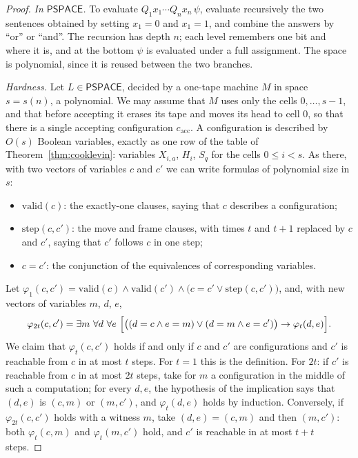 \begin{proof}
\emph{In $\mathsf{PSPACE}$.} To evaluate $Q_1x_1\cdots Q_nx_n\,\psi$, evaluate recursively the two sentences obtained by setting $x_1=0$ and $x_1=1$, and combine the answers by ``or'' or ``and''. The recursion has depth $n$; each level remembers one bit and where it is, and at the bottom $\psi$ is evaluated under a full assignment. The space is polynomial, since it is reused between the two branches.

\emph{Hardness.} Let $L\in\mathsf{PSPACE}$, decided by a one-tape machine $M$ in space $s=s(n)$, a polynomial. We may assume that $M$ uses only the cells $0,\dots,s-1$, and that before accepting it erases its tape and moves its head to cell $0$, so that there is a single accepting configuration $c_{\mathrm{acc}}$. A configuration is described by $O(s)$ Boolean variables, exactly as one row of the table of Theorem~\ref{thm:cooklevin}: variables $X_{i,a}$, $H_i$, $S_q$ for the cells $0\le i<s$. As there, with two vectors of variables $c$ and $c'$ we can write formulas of polynomial size in $s$:
\begin{itemize}
\item $\mathrm{valid}(c)$: the exactly-one clauses, saying that $c$ describes a configuration;
\item $\mathrm{step}(c,c')$: the move and frame clauses, with times $t$ and $t+1$ replaced by $c$ and $c'$, saying that $c'$ follows $c$ in one step;
\item $c=c'$: the conjunction of the equivalences of corresponding variables.
\end{itemize}
Let $\varphi_1(c,c')=\mathrm{valid}(c)\land\mathrm{valid}(c')\land\bigl(c=c'\lor\mathrm{step}(c,c')\bigr)$, and, with new vectors of variables $m$, $d$, $e$,
\[
\varphi_{2t}(c,c')=\exists m\ \forall d\ \forall e\ \Bigl[\bigl((d=c\land e=m)\lor(d=m\land e=c')\bigr)\to\varphi_t(d,e)\Bigr].
\]
We claim that $\varphi_t(c,c')$ holds if and only if $c$ and $c'$ are configurations and $c'$ is reachable from $c$ in at most $t$ steps. For $t=1$ this is the definition. For $2t$: if $c'$ is reachable from $c$ in at most $2t$ steps, take for $m$ a configuration in the middle of such a computation; for every $d,e$, the hypothesis of the implication says that $(d,e)$ is $(c,m)$ or $(m,c')$, and $\varphi_t(d,e)$ holds by induction. Conversely, if $\varphi_{2t}(c,c')$ holds with a witness $m$, take $(d,e)=(c,m)$ and then $(m,c')$: both $\varphi_t(c,m)$ and $\varphi_t(m,c')$ hold, and $c'$ is reachable in at most $t+t$ steps.


\end{proof}
